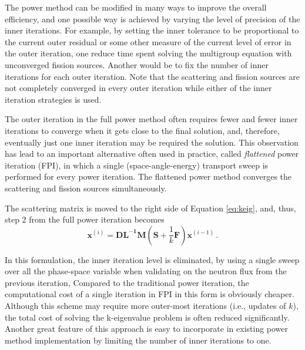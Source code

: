 The power method can be modified in many ways to improve the overall efficiency, and one possible way is achieved by varying the level of precision of the inner iterations.
For example, by setting the inner tolerance to be proportional to the current outer residual or some other measure of the current level of error in the outer iteration, one reduce time spent solving the multigroup equation with unconverged fission sources.
Another would be to fix the number of inner iterations for each outer iteration.
Note that the scattering and fission sources are not completely converged in every outer iteration while either of the inner iteration strategies is used.
\citep{gill_newtons_2011}

The outer iteration in the full power method often requires fewer and fewer inner iterations to converge when it gets close to the final solution, and, therefore, eventually just one inner iteration may be required the solution.  
This observation has lead to an important alternative often used in practice, called {\it flattened} power iteration (FPI), in which a single (space-angle-energy) transport sweep is performed for every power iteration.
The flattened power method converges the scattering and fission sources simultaneously.

The scattering matrix is moved to the right side of Equation \ref{eq:keig}, and, thus, step 2 from the full power iteration becomes 
\begin{equation}
 \mathbf{x}^{(i)} =  \mathbf{DL^{-1}M} (\mathbf{S} + \frac{1}{k} \mathbf{F})\mathbf{x}^{(i-1)}   \, .
 \label{eq:flatten}
\end{equation}

In this formulation, the inner iteration level is eliminated, by using a single sweep over all the phase-space variable when validating on the neutron flux from the previous iteration,  
Compared to the traditional power iteration, the computational cost of a single iteration in FPI in this form is obviously cheaper.
Although this scheme may require more outer-most iterations (i.e., updates of $k$), the total cost of solving the k-eigenvalue problem is often reduced significantly.\citep{gill_newtons_2011}
Another great feature of this approach is easy to incorporate in existing power method implementation by limiting the number of inner iterations to one. 
